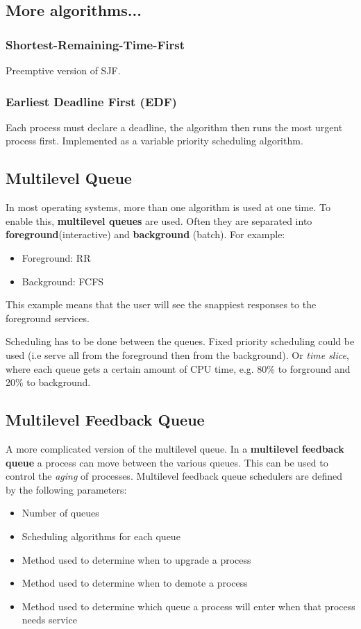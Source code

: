\documentclass{article}%
\begin{document}
\subsection{More algorithms...}
\subsubsection{Shortest-Remaining-Time-First}
Preemptive version of SJF.

\subsubsection{Earliest Deadline First (EDF)}
Each process must declare a deadline, the algorithm then runs the most urgent process first.
Implemented as a variable priority scheduling algorithm.

\subsection{Multilevel Queue}
In most operating systems, more than one algorithm is used at one time.
To enable this, \textbf{multilevel queues} are used.
Often they are separated into \textbf{foreground}(interactive) and \textbf{background} (batch).
For example:
\begin{itemize}
	\item Foreground: RR
	\item Background: FCFS
\end{itemize}
This example means that the user will see the snappiest responses to the foreground services.

Scheduling has to be done between the queues.
Fixed priority scheduling could be used (i.e serve all from the foreground then from the background).
Or \textit{time slice}, where each queue gets a certain amount of CPU time, e.g. 80\% to forground and 20\% to background.

\subsection{Multilevel Feedback Queue}
A more complicated version of the multilevel queue.
In a \textbf{multilevel feedback queue} a process can move between the various queues.
This can be used to control the \textit{aging} of processes.
Multilevel feedback queue schedulers are defined by the following parameters:
\begin{itemize}
	\item Number of queues
	\item Scheduling algorithms for each queue
	\item Method used to determine when to upgrade a process
	\item Method used to determine when to demote a process
	\item Method used to determine which queue a process will enter when that process needs service
\end{itemize}
\end{document}
